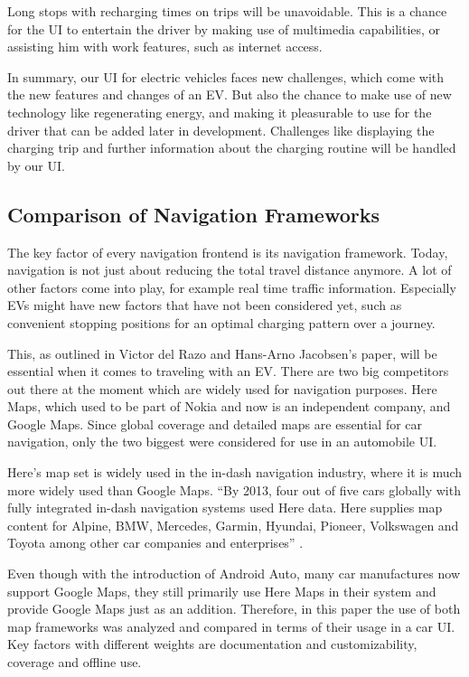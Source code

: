 Long stops with recharging times on trips will be unavoidable. This is a chance for the UI to entertain the driver by making use of multimedia capabilities, or assisting him with work features, such as internet access. 

In summary, our UI for electric vehicles faces new challenges, which come with the new features and changes of an EV. But also the chance to make use of new technology like regenerating energy, and making it pleasurable to use for the driver that can be added later in development. Challenges like displaying the charging trip and further information about the charging routine will be handled by our UI. 

\subsection{Comparison of Navigation Frameworks}

The key factor of every navigation frontend is its navigation framework. Today, navigation is not just about reducing the total travel distance anymore. A lot of other factors come into play, for example real time traffic information. Especially EVs might have new factors that have not been considered yet, such as convenient stopping positions for an optimal charging pattern over a journey.

This, as outlined in Victor del Razo and Hans-Arno Jacobsen's paper, will be essential when it comes to traveling with an EV. There are two big competitors out there at the moment which are widely used for navigation purposes. Here Maps, which used to be part of Nokia and now is an independent company, and Google Maps. Since global coverage and detailed maps are essential for car navigation, only the two biggest were considered for use in an automobile UI.

Here's map set is widely used in the in-dash navigation industry, where it is much more widely used than Google Maps. ``By 2013, four out of five cars globally with fully integrated in-dash navigation systems used Here data. Here supplies map content for Alpine, BMW, Mercedes, Garmin, Hyundai, Pioneer, Volkswagen and Toyota among other car companies and enterprises'' \cite{driver-12}.

Even though with the introduction of Android Auto, many car manufactures now support Google Maps, they still primarily use Here Maps in their system and provide Google Maps just as an addition. Therefore, in this paper the use of both map frameworks was analyzed and compared in terms of their usage in a car UI. Key factors with different weights are documentation and customizability, coverage and offline use.


